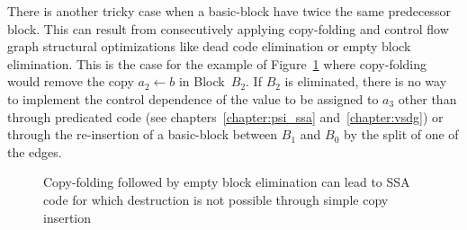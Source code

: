 There is another tricky case when a basic-block have twice the same predecessor block. This can result from consecutively applying copy-folding and control flow graph structural optimizations like dead code elimination or empty block elimination. This is the case for the example of Figure~\ref{fig:alternative_ssa_destruction:doublepreds} where copy-folding would remove the copy $a_2\gets b$ in Block~$B_2$. If $B_2$ is eliminated, there is no way to implement the control dependence of the value to be assigned to $a_3$ other than through predicated code (see chapters~\ref{chapter:psi_ssa} and~\ref{chapter:vsdg}) or through the re-insertion of a basic-block between $B_1$ and $B_0$ by the split of one of the edges.

\begin{figure}[h]
\hfill
{}\hfill
{}\caption{\label{fig:alternative_ssa_destruction:doublepreds} Copy-folding followed by empty block elimination can lead to SSA code for which destruction is not possible through simple copy insertion}
\end{figure}


